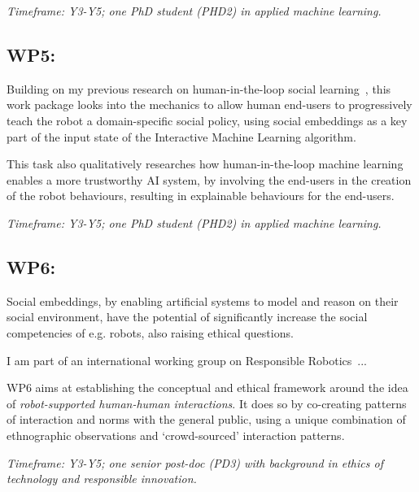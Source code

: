 
\vspace{1em}
\noindent\emph{Timeframe: Y3-Y5; one PhD student (PHD2) in applied machine
    learning.}


\subsection{WP5: \textbf{\wpFive}}

Building on my previous research on human-in-the-loop social
learning~\cite{senft2017supervised, senft2019teaching,
winkle2020couch,winkle2021leador}, this work package looks into the mechanics to
allow human end-users to progressively teach the robot a domain-specific social
policy, using social embeddings as a key part of the input state of the
Interactive Machine Learning algorithm.

This task also qualitatively researches how human-in-the-loop machine
learning enables a more trustworthy AI system, by involving the end-users in the
creation of the robot behaviours, resulting in explainable behaviours for the
end-users.


\vspace{1em}
\noindent\emph{Timeframe: Y3-Y5; one PhD student (PHD2) in applied machine
    learning.}


\subsection{WP6: \textbf{\wpSix}}


Social embeddings, by enabling artificial systems to model and reason on their
social environment, have the potential of significantly increase the social
competencies of e.g. robots, also raising ethical questions.

I am part of an international working group on Responsible Robotics~...

WP6 aims at establishing the conceptual and ethical framework around the idea of
\emph{robot-supported human-human interactions}. It does so by co-creating
patterns of interaction and norms with the general public, using a unique
combination of ethnographic observations and `crowd-sourced' interaction
patterns.

\vspace{1em}
\noindent\emph{Timeframe: Y3-Y5; one senior post-doc (PD3)
with background in ethics of technology and responsible innovation.}


